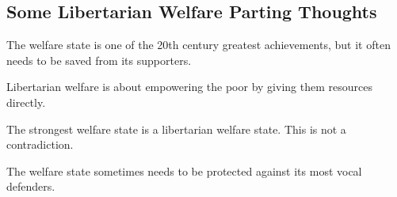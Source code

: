 \subsection{Some Libertarian Welfare Parting Thoughts}

\thought The welfare state is one of the 20th century greatest achievements,
but it often needs to be saved from its supporters.

\thought Libertarian welfare is about empowering the poor by giving them
resources directly.

\thought The strongest welfare state is a libertarian welfare state. This is
not a contradiction.

\thought The welfare state sometimes needs to be protected against its most
vocal defenders.

